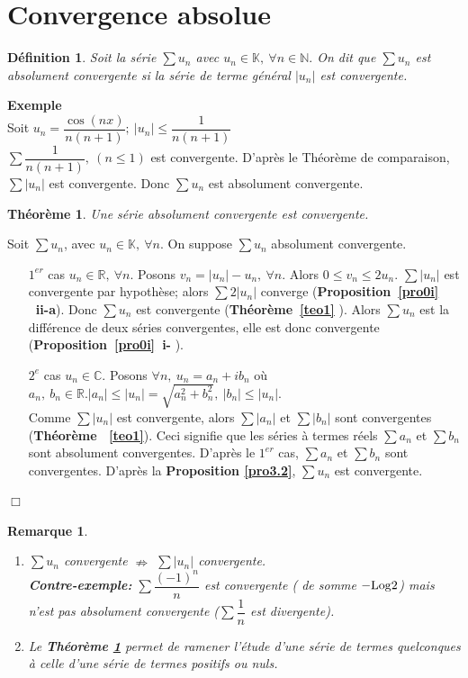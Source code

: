 \documentclass[11pt, a4paper]{book}
\newtheorem{teo}{Th\'eor\`eme}[section]
\newtheorem{defi}{D\'efinition}[section]
\newtheorem{rem}{Remarque}[section]
\newenvironment{pr}{\noindent {\bf Preuve} \noindent} {\hfill $\Box$\vskip 5mm}
\begin{document}
\section{Convergence absolue}
\begin{defi} Soit la s\'erie $\sum u_{n}$ avec $u_{n}\in \mathbb{K},~\forall n \in \mathbb{N}.$ On dit que $\sum u_{n}$ est absolument convergente si la s\'erie de terme g\'en\'eral $|u_{n}|$ est convergente.\end{defi}
\textbf{Exemple}\\ Soit $u_{n}=\dfrac{\cos(nx)}{n(n+1)};~ |u_{n}|\leq \dfrac{1}{n(n+1)}$\\
$\sum \dfrac{1}{n(n+1)},~(n\leq 1)$ est convergente. D'apr\`es le Th\'eor\`eme de comparaison, $\sum |u_{n}|$ est convergente. Donc $\sum u_{n}$ est absolument convergente.
\begin{teo} \label{teo5.1} Une s\'erie absolument convergente est convergente. \end{teo}
\begin{pr}\quad Soit $\sum u_{n}$, avec $u_{n}\in \mathbb{K},~ \forall n.$ On suppose $\sum u_{n}$ absolument convergente. \begin{enumerate}
\item[$1^{er}$ cas] $u_{n}\in \mathbb{R},~\forall n.$ Posons $v_{n}=|u_{n}|-u_{n},~\forall n.$ Alors $0\leq v_{n}\leq 2u_{n}.$ $\sum |u_{n}|$ est convergente par hypoth\`ese; alors $\sum 2|u_n|$ converge (\textbf{Proposition~\ref{pro0i} ~ii-a}). Donc $\sum u_n$ est convergente (\textbf{Th\'eor\`eme~\ref{teo1} }). Alors $\sum u_n$ est la diff\'erence de deux s\'eries convergentes, elle est donc convergente (\textbf{Proposition~\ref{pro0i}~i- }).
\item[$2^{e}$ cas] $u_n \in \mathbb{C}.$ Posons $\forall n, ~u_n=a_n+ib_n $ o\`u $a_n, ~ b_n \in \mathbb{R}. |a_n| \leq |u_n|=\sqrt{a_n ^2 + b_n ^2},~ |b_n| \leq |u_n|.$\\ Comme $\sum |u_n|$ est convergente, alors $\sum |a_n|$ et $\sum |b_n|$ sont convergentes (\textbf{Th\'eor\`eme ~\ref{teo1}}). Ceci signifie que les s\'eries \`a termes r\'eels $\sum a_n$ et $\sum b_n$ sont absolument convergentes. D'apr\`es le $1^{er}$ cas, $\sum a_n$ et $\sum b_n$ sont convergentes. D'apr\`es la \textbf{Proposition \ref{pro3.2}}, $\sum u_n$ est convergente.
\end{enumerate}
\end{pr}
\begin{rem} \begin{enumerate}
\item $\sum u_n$ convergente $\nRightarrow$ $\sum |u_n|$ convergente.\\
\textbf{Contre-exemple: }\quad $\sum \dfrac{(-1)^n}{n}$ est convergente ( de somme $- \mathrm{Log}2$) mais n'est pas absolument convergente ($\sum \dfrac{1}{n}$ est divergente).
\item Le \textbf{Th\'eor\`eme \ref{teo5.1}} permet de ramener l'\'etude d'une s\'erie de termes quelconques \`a celle d'une s\'erie de termes positifs ou nuls. 
\end{enumerate} \end{rem}
\end{document}
